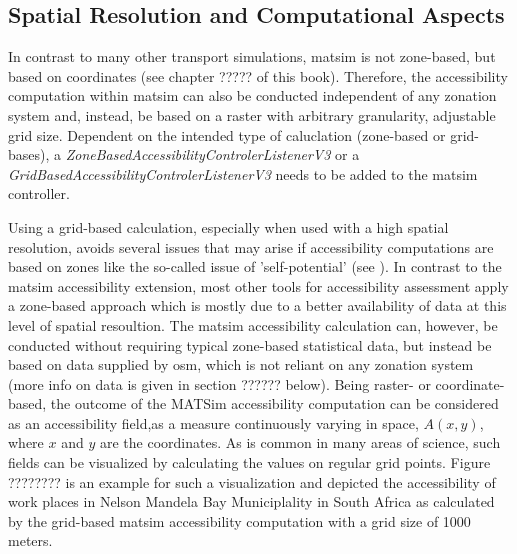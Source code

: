 

\subsection{Spatial Resolution and Computational Aspects}
In contrast to many other transport simulations, \gls{matsim} is not zone-based, but based on coordinates (see 
chapter ????? of this book). Therefore, the accessibility computation within \gls{matsim} can also be conducted independent 
of any zonation system and, instead, be based on a raster with arbitrary granularity, \ie adjustable grid
size. Dependent on the intended type of caluclation (zone-based or grid-bases), a 
\textit{ZoneBasedAccessibilityControlerListenerV3} or a \textit{GridBasedAccessibilityControlerListenerV3} needs to be added
to the \gls{matsim} controller.


Using a grid-based calculation, especially when used with a high spatial resolution, avoids several issues
that may arise if accessibility computations are based on zones like the so-called issue of 'self-potential'
(see \citep[e.g.,][]{NicolaiNagel2012HiResAccessibilityMethodInBook}). In contrast to the \gls{matsim} accessibility
extension, most other tools for accessibility assessment apply a zone-based approach 
\citep{CurtisEtAl2013AccessibilityPolicyInnovation, LiuZhu2004AccessibilityAnalyst, BuettnerEtAl2010Erreichbarkeitsatlas}
which is mostly due to a better availability of data at this level of spatial resoultion. The \gls{matsim} accessibility
calculation can, however, be conducted without requiring typical zone-based statistical data, but instead be based on data 
supplied by \gls{osm}, which is not reliant on any zonation system (more info on data is given in section ?????? below).
Being raster- or coordinate-based, the outcome of the MATSim accessibility computation can be considered as an accessibility 
field,\ie as a measure continuously varying in space, $A(x,y)$, where $x$ and $y$ are the coordinates. As is common in many areas 
of science, such fields can be visualized by calculating the values on regular grid points. Figure ???????? is an example for such 
a visualization and depicted the accessibility of work places in Nelson Mandela Bay Municiplality in South Africa as calculated
by the grid-based \gls{matsim} accessibility computation with a grid size of 1000 meters.

